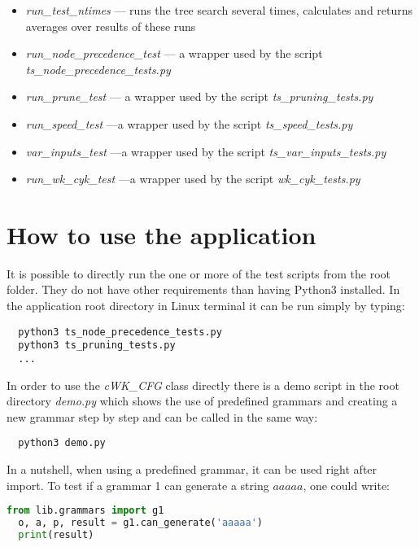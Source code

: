 \begin{itemize}
  \item{\textit{run\_test\_ntimes} --- runs the tree search several times, calculates and returns averages over results of these runs}
  \item{\textit{run\_node\_precedence\_test} --- a wrapper used by the script \textit{ts\_node\_precedence\_tests.py}}
  \item{\textit{run\_prune\_test} --- a wrapper used by the script \textit{ts\_pruning\_tests.py}}
  \item{\textit{run\_speed\_test} ---a wrapper used by the script \textit{ts\_speed\_tests.py}}
  \item{\textit{var\_inputs\_test} ---a wrapper used by the script \textit{ts\_var\_inputs\_tests.py}}
  \item{\textit{run\_wk\_cyk\_test} ---a wrapper used by the script \textit{wk\_cyk\_tests.py}}
\end{itemize}


\section{How to use the application}
It is possible to directly run the one or more of the test scripts from the root folder. They do not have other requirements than having Python3 installed. In the application root directory in Linux terminal it can be run simply by typing:

\begin{verbatim}
  python3 ts_node_precedence_tests.py
  python3 ts_pruning_tests.py
  ...
\end{verbatim}

In order to use the \textit{cWK\_CFG} class directly there is a demo script in the root directory \textit{demo.py} which shows the use of predefined grammars and creating a new grammar step by step and can be called in the same way:

\begin{verbatim}
  python3 demo.py
\end{verbatim}

In a nutshell, when using a predefined grammar, it can be used right after import. To test if a grammar 1 can generate a string $aaaaa$, one could write:
\begin{lstlisting}[language=Python]
  from lib.grammars import g1
  o, a, p, result = g1.can_generate('aaaaa')
  print(result)
\end{lstlisting}

